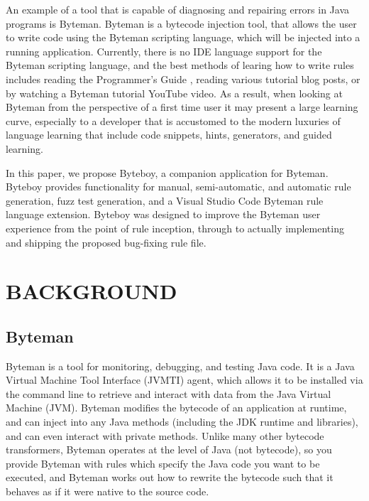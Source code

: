 \documentclass[letterpaper,twocolumn,10pt]{article}
\begin{document}
An example of a tool that is capable of diagnosing and repairing errors in Java programs is Byteman\cite{bytemanwebsite}. Byteman is a bytecode injection tool, that allows the user to write code using the Byteman scripting language, which will be injected into a running application. Currently, there is no IDE language support for the Byteman scripting language, and the best methods of learing how to write rules includes reading the Programmer's Guide \cite{bytemanguide}, reading various tutorial blog posts\cite{bytemanblog}, or by watching a Byteman tutorial YouTube video\cite{bytemanvideo}. As a result, when looking at Byteman from the perspective of a first time user it may present a large learning curve, especially to a developer that is accustomed to the modern luxuries of language learning that include code snippets, hints, generators\cite{yoman}, and guided learning.

In this paper, we propose Byteboy\cite{byteboy}, a companion application for Byteman. Byteboy provides functionality for manual, semi-automatic, and automatic rule generation, fuzz test generation, and a Visual Studio Code Byteman rule language extension. Byteboy was designed to improve the Byteman user experience from the point of rule inception, through to actually implementing and shipping the proposed bug-fixing rule file.



\section{BACKGROUND}

\subsection{Byteman}

Byteman is a tool for monitoring, debugging, and testing Java code\cite{bytemanwebsite}. It is a Java Virtual Machine Tool Interface (JVMTI) agent, which allows it to be installed via the command line to retrieve and interact with data from the Java Virtual Machine (JVM). Byteman modifies the bytecode of an application at runtime, and can inject into any Java methods (including the JDK runtime and libraries), and can even interact with private methods\cite{bytemanwebsite}. Unlike many other bytecode transformers, Byteman operates at the level of Java (not bytecode), so you provide Byteman with rules which specify the Java code you want to be executed, and Byteman works out how to rewrite the bytecode such that it behaves as if it were native to the source code\cite{bytemanwebsite}.
\end{document}
